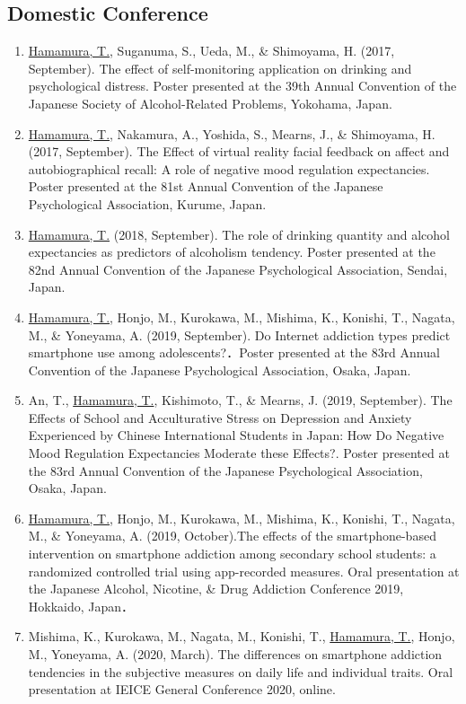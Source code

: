 \documentclass{article}
\begin{document}
\subsection{Domestic Conference}
\begin{enumerate}
	\item \underline{Hamamura, T.}, Suganuma, S., Ueda, M., \& Shimoyama, H. (2017, September). The effect of self-monitoring application on drinking and psychological distress. Poster presented at the 39th Annual Convention of the Japanese Society of Alcohol-Related Problems, Yokohama, Japan.
	\item \underline{Hamamura, T.}, Nakamura, A., Yoshida, S., Mearns, J., \& Shimoyama, H. (2017, September). The Effect of virtual reality facial feedback on affect and autobiographical recall: A role of negative mood regulation expectancies. Poster presented at the 81st Annual Convention of the Japanese Psychological Association, Kurume, Japan.
	\item \underline{Hamamura, T.} (2018, September). The role of drinking quantity and alcohol expectancies as predictors of alcoholism tendency. Poster presented at the 82nd Annual Convention of the Japanese Psychological Association, Sendai, Japan.
	\item \underline{Hamamura, T.}, Honjo, M., Kurokawa, M., Mishima, K., Konishi, T., Nagata, M., \& Yoneyama, A. (2019, September). Do Internet addiction types predict smartphone use among adolescents?．Poster presented at the 83rd Annual Convention of the Japanese Psychological Association, Osaka, Japan.
	\item An, T., \underline{Hamamura, T.}, Kishimoto, T., \& Mearns, J. (2019, September). The Effects of School and Acculturative Stress on Depression and Anxiety Experienced by Chinese International Students in Japan: How Do Negative Mood Regulation Expectancies Moderate these Effects?. Poster presented at the 83rd Annual Convention of the Japanese Psychological Association, Osaka, Japan.
	\item \underline{Hamamura, T.}, Honjo, M., Kurokawa, M., Mishima, K., Konishi, T., Nagata, M., \& Yoneyama, A. (2019, October).The effects of the smartphone-based intervention on smartphone addiction among secondary school students: a randomized controlled trial using app-recorded measures. Oral presentation at the Japanese Alcohol, Nicotine, \& Drug Addiction Conference 2019, Hokkaido, Japan．
	\item Mishima, K., Kurokawa, M., Nagata, M., Konishi, T., \underline{Hamamura, T.}, Honjo, M., Yoneyama, A. (2020, March). The differences on smartphone addiction tendencies in the subjective measures on daily life and individual traits. Oral presentation at IEICE General Conference 2020, online.

\end{enumerate}
\end{document}
